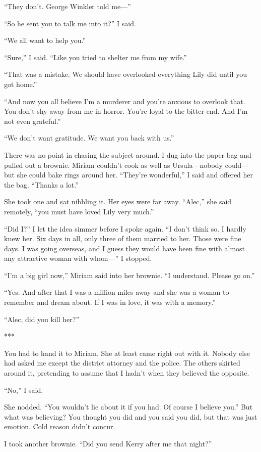 {“They don’t. George Winkler told me—”

“So he sent you to talk me into it?” I said.

“We all want to help you.”

“Sure,” I said. “Like you tried to shelter me from my wife.”

“That was a mistake. We should have overlooked everything Lily did until you got home.”

“And now you all believe I’m a murderer and you’re anxious to overlook that. You don’t shy away from me in horror. You’re loyal to the bitter end. And I’m not even grateful.”

“We don’t want gratitude. We want you back with us.”

There was no point in chasing the subject around. I dug into the paper bag and pulled out a brownie. Miriam couldn’t cook as well as Ursula—nobody could—but she could bake rings around her. “They’re wonderful,” I said and offered her the bag. “Thanks a lot.”

She took one and sat nibbling it. Her eyes were far away. “Alec,” she said remotely, “you must have loved Lily very much.”

“Did I?” I let the idea simmer before I spoke again. “I don’t think so. I hardly knew her. Six days in all, only three of them married to her. Those were fine days. I was going overseas, and I guess they would have been fine with almost any attractive woman with whom—” I stopped.

“I’m a big girl now,” Miriam said into her brownie. “I understand. Please go on.”

“Yes. And after that I was a million miles away and she was a woman to remember and dream about. If I was in love, it was with a memory.”

“Alec, did you kill her?”

***

You had to hand it to Miriam. She at least came right out with it. Nobody else had asked me except the district attorney and the police. The others skirted around it, pretending to assume that I hadn’t when they believed the opposite.

“No,” I said.

She nodded. “You wouldn’t lie about it if you had. Of course I believe you.” But what was believing? You thought you did and you said you did, but that was just emotion. Cold reason didn’t concur.

I took another brownie. “Did you send Kerry after me that night?”

}
